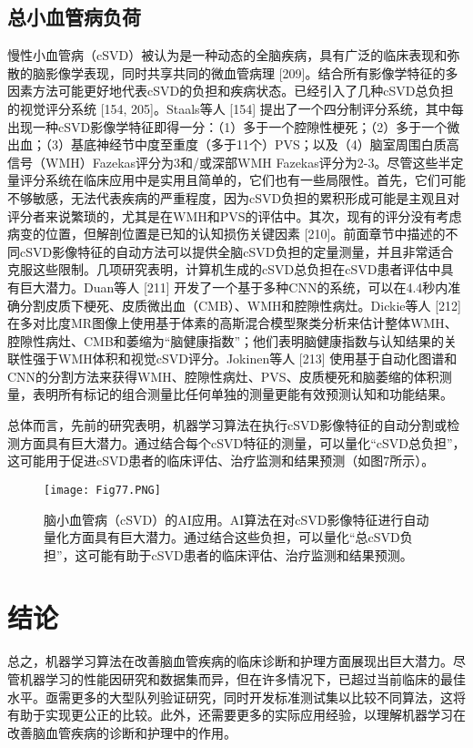 \documentclass[11pt]{article}
\begin{document}
\subsection{\kaishu  总小血管病负荷}

慢性小血管病（cSVD）被认为是一种动态的全脑疾病，具有广泛的临床表现和弥散的脑影像学表现，同时共享共同的微血管病理 [209]。结合所有影像学特征的多因素方法可能更好地代表cSVD的负担和疾病状态。已经引入了几种cSVD总负担的视觉评分系统 [154, 205]。Staals等人 [154] 提出了一个四分制评分系统，其中每出现一种cSVD影像学特征即得一分：（1）多于一个腔隙性梗死；（2）多于一个微出血；（3）基底神经节中度至重度（多于11个）PVS；以及（4）脑室周围白质高信号（WMH）Fazekas评分为3和/或深部WMH Fazekas评分为2-3。尽管这些半定量评分系统在临床应用中是实用且简单的，它们也有一些局限性。首先，它们可能不够敏感，无法代表疾病的严重程度，因为cSVD负担的累积形成可能是主观且对评分者来说繁琐的，尤其是在WMH和PVS的评估中。其次，现有的评分没有考虑病变的位置，但解剖位置是已知的认知损伤关键因素 [210]。前面章节中描述的不同cSVD影像特征的自动方法可以提供全脑cSVD负担的定量测量，并且非常适合克服这些限制。几项研究表明，计算机生成的cSVD总负担在cSVD患者评估中具有巨大潜力。Duan等人 [211] 开发了一个基于多种CNN的系统，可以在4.4秒内准确分割皮质下梗死、皮质微出血（CMB）、WMH和腔隙性病灶。Dickie等人 [212] 在多对比度MR图像上使用基于体素的高斯混合模型聚类分析来估计整体WMH、腔隙性病灶、CMB和萎缩为“脑健康指数”；他们表明脑健康指数与认知结果的关联性强于WMH体积和视觉cSVD评分。Jokinen等人 [213] 使用基于自动化图谱和CNN的分割方法来获得WMH、腔隙性病灶、PVS、皮质梗死和脑萎缩的体积测量，表明所有标记的组合测量比任何单独的测量更能有效预测认知和功能结果。

总体而言，先前的研究表明，机器学习算法在执行cSVD影像特征的自动分割或检测方面具有巨大潜力。通过结合每个cSVD特征的测量，可以量化“cSVD总负担”，这可能用于促进cSVD患者的临床评估、治疗监测和结果预测（如图7所示）。

\begin{figure}[!htb]
	\centering
	\texttt{[image: Fig77.PNG]}
	\caption{\kaishu \kaishu 脑小血管病（cSVD）的AI应用。AI算法在对cSVD影像特征进行自动量化方面具有巨大潜力。通过结合这些负担，可以量化“总cSVD负担”，这可能有助于cSVD患者的临床评估、治疗监测和结果预测。}
	\label{Fig7}
\end{figure}

\section{\kaishu 结论}

总之，机器学习算法在改善脑血管疾病的临床诊断和护理方面展现出巨大潜力。尽管机器学习的性能因研究和数据集而异，但在许多情况下，已超过当前临床的最佳水平。亟需更多的大型队列验证研究，同时开发标准测试集以比较不同算法，这将有助于实现更公正的比较。此外，还需要更多的实际应用经验，以理解机器学习在改善脑血管疾病的诊断和护理中的作用。
\end{document}
